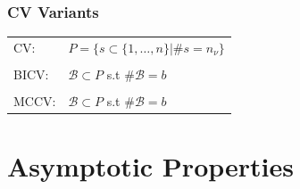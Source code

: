 \documentclass[20pt,mathserif,xcolor=dvipsnames]{beamer}
\begin{document}


\begin{frame}
\frametitle{CV Variants}
\setlength{\tabcolsep}{1pt}
\begin{tabular}{ll}
	CV:& $P=\{s\subset\{1,\ldots,n\}|\#s= n_\nu\}$\\\\
	BICV:& $\mathcal{B}\subset P $ s.t $\# \mathcal{B}=b$\\\\
	MCCV:& $\mathcal{B}\subset P$ s.t $\# \mathcal{B}=b$
\end{tabular}
\end{frame}

\thispagestyle{empty}
\section{Asymptotic Properties}
\end{document}
